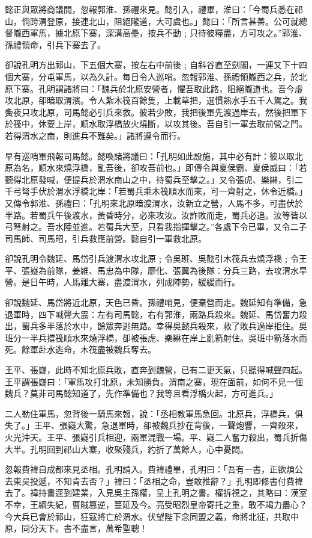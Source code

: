 懿正與眾將商議間，忽報郭淮、孫禮來見。懿引入，禮畢，淮曰：「今蜀兵悉在祁山，倘跨渭登原，接連北山，阻絕隴道，大可虞也。」懿曰：「所言甚善。公可就總督隴西軍馬，據北原下寨，深溝高壘，按兵不動﹔只待彼糧盡，方可攻之。”郭淮、孫禮領命，引兵下寨去了。

卻說孔明方出祁山，下五個大寨，按左右中前後﹔自斜谷直至劍閣，一連又下十四個大寨，分屯軍馬，以為久計。每日令人巡哨。忽報郭淮、孫禮領隴西之兵，於北原下寨。孔明謂諸將曰：「魏兵於北原安營者，懼吾取此路，阻絕隴道也。吾今虛攻北原，卻暗取渭濱。令人紮木筏百餘隻，上載草把，選慣熟水手五千人駕之。我夤夜只攻北原，司馬懿必引兵來救。彼若少敗，我把後軍先渡過岸去，然後把軍下於筏中，休要上岸，順水取浮橋放火燒斷，以攻其後。吾自引一軍去取前營之門。若得渭水之南，則進兵不難矣。」諸將遵令而行。

早有巡哨軍飛報司馬懿。懿喚諸將議曰：「孔明如此設施，其中必有計：彼以取北原為名，順水來燒浮橋，亂吾後，卻攻吾前也。」即傳令與夏侯霸、夏侯威曰：「若聽得北原發喊，便提兵於渭水南山之中，待蜀兵至擊之。」又令張虎、樂綝，引二千弓弩手伏於渭水浮橋北岸：「若蜀兵乘木筏順水而來，可一齊射之，休令近橋。」又傳令郭淮、孫禮曰：「孔明來北原暗渡渭水，汝新立之營，人馬不多，可盡伏於半路。若蜀兵午後渡水，黃昏時分，必來攻汝。汝詐敗而走，蜀兵必追。汝等皆以弓弩射之。吾水陸並進。若蜀兵大至，只看我指揮擊之。”各處下令已畢，又令二子司馬師、司馬昭，引兵救應前營。懿自引一軍救北原。

卻說孔明令魏延、馬岱引兵渡渭水攻北原﹔令吳班、吳懿引木筏兵去燒浮橋﹔令王平、張嶷為前隊，姜維、馬忠為中隊，廖化、張翼為後隊：分兵三路，去攻渭水旱營。是日午時，人馬離大寨，盡渡渭水，列成陣勢，緩緩而行。

卻說魏延、馬岱將近北原，天色已昏。孫禮哨見，便棄營而走。魏延知有準備，急退軍時，四下喊聲大震：左有司馬懿，右有郭淮，兩路兵殺來。魏延、馬岱奮力殺出，蜀兵多半落於水中，餘眾奔逃無路。幸得吳懿兵殺來，救了敗兵過岸拒住。吳班分一半兵撐筏順水來燒浮橋，卻被張虎、樂綝在岸上亂箭射住。吳班中箭落水而死。餘軍赴水逃命，木筏盡被魏兵奪去。

王平、張嶷，此時不知北原兵敗，直奔到魏營，已有二更天氣，只聽得喊聲四起。王平謂張嶷曰：「軍馬攻打北原，未知勝負。渭南之寨，現在面前，如何不見一個魏兵？莫非司馬懿知道了，先作準備也？我等且看浮橋火起，方可進兵。」

二人勒住軍馬，忽背後一騎馬來報，說：「丞相教軍馬急回。北原兵，浮橋兵，俱失了。」王平、張嶷大驚，急退軍時，卻被魏兵抄在背後，一聲炮響，一齊殺來，火光沖天。王平、張嶷引兵相迎，兩軍混戰一場。平、嶷二人奮力殺出，蜀兵折傷大半。孔明回到祁山大寨，收聚殘兵，約折了萬餘人，心中憂悶。

忽報費褘自成都來見丞相。孔明請入。費褘禮畢，孔明曰：「吾有一書，正欲煩公去東吳投遞，不知肯去否？」褘曰：「丞相之命，豈敢推辭？」孔明即修書付費褘去了。褘持書逕到建業，入見吳主孫權，呈上孔明之書。權拆視之，其略曰：漢室不幸，王綱失紀，曹賊篡逆，蔓延及今。亮受昭烈皇帝寄托之重，敢不竭力盡心？今大兵已會於祁山，狂寇將亡於渭水。伏望陛下念同盟之義，命將北征，共取中原，同分天下。書不盡言，萬希聖聰！

